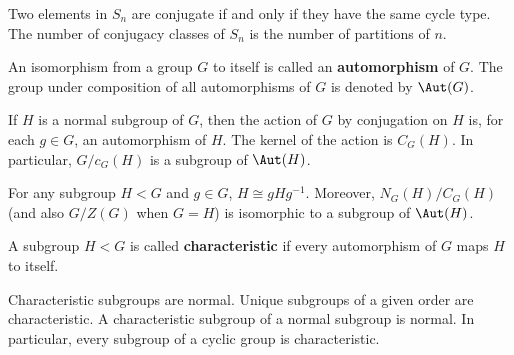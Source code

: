 \begin{proposition}
	\cite[126]{DummitFoote2004}
	Two elements in $S_n$ are conjugate if and only if they have the same cycle type.
	The number of conjugacy classes of $S_n$ is the number of partitions of $n$.
\end{proposition}

\begin{definition}
	\cite[133]{DummitFoote2004}
	An isomorphism from a group $G$ to itself is called an \textbf{automorphism} of $G$.
	The group under composition of all automorphisms of $G$ is denoted by $\Aut(G)$.
\end{definition}

\begin{proposition}
	\cite[133]{DummitFoote2004}
	If $H$ is a normal subgroup of $G$, then the action of $G$
	by conjugation on $H$ is, for each $g \in G$, an automorphism of $H$. The kernel of the
	action is $C_G(H)$. In particular, $G / c_G(H)$ is a subgroup of $\Aut(H)$.
\end{proposition}

\begin{corollary}
	\cite[134]{DummitFoote2004}
	For any subgroup $H < G$ and $g \in G$, $H \cong gHg^{-1}$. Moreover, $N_G(H) / C_G(H)$
	(and also $G/Z(G)$ when $G = H$) is isomorphic to a subgroup of $\Aut(H)$.
\end{corollary}

\begin{definition}
	\cite[135]{DummitFoote2004}
	A subgroup $H < G$ is called \textbf{characteristic} if every automorphism of $G$ maps
	$H$ to itself.
\end{definition}

\begin{proposition}
	\cite[135]{DummitFoote2004}
	Characteristic subgroups are normal. Unique subgroups of a given order are
	characteristic. A characteristic subgroup of a normal subgroup is normal. In particular,
	every subgroup of a cyclic group is characteristic.
\end{proposition}

